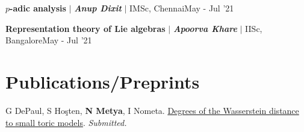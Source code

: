 \resumeProjectHeading
{\textbf{$p$-adic analysis} $|$ \textbf{\emph{Anup Dixit}} $|$ IMSc, Chennai}{May - Jul '21}
\resumeItemListStart
{}
\resumeItemListEnd 
\vspace{\gap}

\resumeProjectHeading
{\textbf{Representation theory of Lie algebras} $|$ \textbf{\emph{Apoorva Khare }}$|$ IISc, Bangalore}{May - Jul '21}
\resumeItemListStart
{}
\resumeItemListEnd 
\resumeSubHeadingListEnd


\section{Publications/Preprints}





\begin{etaremune}[leftmargin=13pt]
\item {\color{grey}G DePaul, S Ho\c{s}ten, \textbf{N Metya}, I Nometa}. \href{https://arxiv.org/abs/2402.09626}{Degrees of the Wasserstein distance to small toric models}. \textit{Submitted.}
\end{etaremune}



